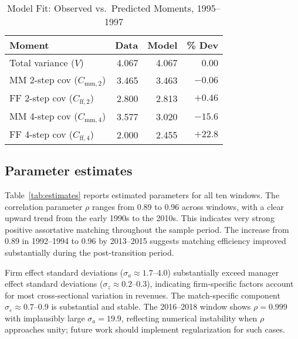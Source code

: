 \documentclass[9pt,twocolumn,twoside]{pnas-new}
\begin{document}
\begin{table}[t]
\centering
\caption{Model Fit: Observed vs.\ Predicted Moments, 1995--1997}
\label{tab:fit}
\begin{tabular}{lrrr}
\toprule
Moment & Data & Model & \% Dev \\
\midrule
Total variance ($V$) & 4.067 & 4.067 & 0.00 \\
MM 2-step cov ($C_{\text{mm},2}$) & 3.465 & 3.463 & $-0.06$ \\
FF 2-step cov ($C_{\text{ff},2}$) & 2.800 & 2.813 & $+0.46$ \\
MM 4-step cov ($C_{\text{mm},4}$) & 3.577 & 3.020 & $-15.6$ \\
FF 4-step cov ($C_{\text{ff},4}$) & 2.000 & 2.455 & $+22.8$ \\
\bottomrule
\end{tabular}

\end{table}

\subsection*{Parameter estimates}
Table~\ref{tab:estimates} reports estimated parameters for all ten windows. The correlation parameter $\rho$ ranges from 0.89 to 0.96 across windows, with a clear upward trend from the early 1990s to the 2010s. This indicates very strong positive assortative matching throughout the sample period. The increase from 0.89 in 1992--1994 to 0.96 by 2013--2015 suggests matching efficiency improved substantially during the post-transition period.

Firm effect standard deviations ($\sigma_a \approx 1.7$--4.0) substantially exceed manager effect standard deviations ($\sigma_z \approx 0.2$--0.3), indicating firm-specific factors account for most cross-sectional variation in revenues. The match-specific component $\sigma_\varepsilon \approx 0.7$--0.9 is substantial and stable. The 2016--2018 window shows $\rho = 0.999$ with implausibly large $\sigma_a = 19.9$, reflecting numerical instability when $\rho$ approaches unity; future work should implement regularization for such cases.
\end{document}
